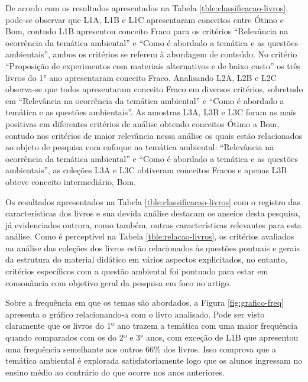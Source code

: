 \begin{refsection}
    De acordo com os resultados apresentados na Tabela \ref{tble:classificacao-livros}, pode-se observar que L1A, L1B e L1C apresentaram conceitos entre Ótimo e Bom, contudo L1B apresentou conceito Fraco para os critérios “Relevância na ocorrência da temática ambiental” e “Como é abordado a temática e as questões ambientais”, ambos os critérios se referem à abordagem de conteúdo. No critério “Proposição de experimentos com materiais alternativos e de baixo custo” os três livros do 1° ano apresentaram conceito Fraco. Analisando L2A, L2B e L2C observa-se que todos apresentaram conceito Fraco em diversos critérios, sobretudo em “Relevância na ocorrência da temática ambiental” e “Como é abordado a temática e as questões ambientais”. As amostras L3A, L3B e L3C foram as mais positivas em diferentes critérios de análise obtendo conceitos Ótimo a Bom, contudo nos critérios de maior relevância nessa análise os quais estão relacionados ao objeto de pesquisa com enfoque na temática ambiental: “Relevância na ocorrência da temática ambiental” e “Como é abordado a temática e as questões ambientais”, as coleções L3A e L3C obtiveram conceitos Fracos e apenas L3B obteve conceito intermediário, Bom.  

    Os resultados apresentados na Tabela \ref{tble:classificacao-livros} com o registro das características dos livros e sua devida análise destacam os anseios desta pesquisa, já evidenciados outrora, como também, outras características relevantes para esta análise. Como é perceptível na Tabela \ref{tble:relacao-livros}, os critérios avaliados na análise das coleções dos livros estão relacionados às questões pontuais e gerais da estrutura do material didático em vários aspectos explicitados, no entanto, critérios específicos com a questão ambiental foi pontuado para estar em consonância com objetivo geral da pesquisa em foco no artigo.  

    Sobre a frequência em que os temas são abordados, a Figura \ref{fig:grafico-freq} apresenta o gráfico relacionando-a com o livro analisado. Pode ser visto claramente que os livros do 1º ano trazem a temática com uma maior frequência quando comparados com os do 2º e 3° anos, com exceção de L1B que apresentou uma frequência semelhante aos outros 66\% dos livros. Isso comprova que a temática ambiental é explorada satisfatoriamente logo que os alunos ingressam no ensino médio ao contrário do que ocorre nos anos anteriores.


\end{refsection}
